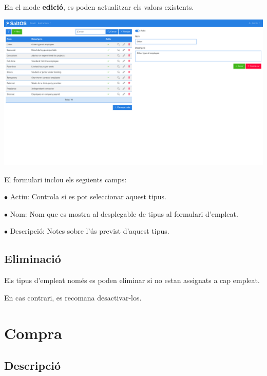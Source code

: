 \documentclass[a4paper]{article}
\begin{document}
En el mode \textbf{edició}, es poden actualitzar els valors existents.

\begin{center}\includegraphics[width=1\textwidth]{../ujest/snaps/test-screenshots-js-screenshots-hr-employees-types-edit-10-ca-es-1-snap.png}\end{center}

El formulari inclou els següents camps:

\begin{compactitem}
\item[\color{myblue}$\bullet$] Actiu: Controla si es pot seleccionar aquest tipus.
\item[\color{myblue}$\bullet$] Nom: Nom que es mostra al desplegable de tipus al formulari d'empleat.
\item[\color{myblue}$\bullet$] Descripció: Notes sobre l'ús previst d'aquest tipus.
\end{compactitem}

\hypertarget{toc115}{}
\subsection{Eliminació}

Els tipus d'empleat només es poden eliminar si no estan assignats a cap empleat.

En cas contrari, es recomana desactivar-los.


\hypertarget{toc116}{}
\section{Compra}

\hypertarget{toc117}{}
\subsection{Descripció}
\end{document}

